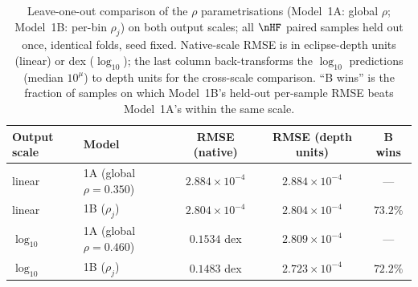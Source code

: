\begin{table}[t]
  \centering
  \caption{Leave-one-out comparison of the $\rho$ parametrisations
  (Model~1A: global $\rho$; Model~1B: per-bin $\rho_j$) on both output
  scales; all $\nHF$ paired samples held out once, identical folds, seed
  fixed. Native-scale RMSE is in eclipse-depth units (linear) or dex
  ($\log_{10}$); the last column back-transforms the $\log_{10}$ predictions
  (median $10^{\mu}$) to depth units for the cross-scale comparison.
  ``B wins'' is the fraction of samples on which Model~1B's held-out
  per-sample RMSE beats Model~1A's within the same scale.}
  \label{tab:model1-loo}
  \begin{tabular}{llccc}
    \toprule
    Output scale & Model & RMSE (native) & RMSE (depth units) & B wins \\
    \midrule
    linear      & 1A (global $\rho=0.350$) & $2.884\times10^{-4}$ & $2.884\times10^{-4}$ & --- \\
    linear      & 1B ($\rho_j$)            & $2.804\times10^{-4}$ & $2.804\times10^{-4}$ & $73.2\%$ \\
    \midrule
    $\log_{10}$ & 1A (global $\rho=0.460$) & $0.1534$ dex & $2.809\times10^{-4}$ & --- \\
    $\log_{10}$ & 1B ($\rho_j$)            & $0.1483$ dex & $2.723\times10^{-4}$ & $72.2\%$ \\
    \bottomrule
  \end{tabular}
\end{table}
